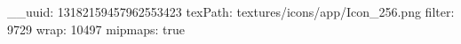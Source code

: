 __uuid: 13182159457962553423
texPath: textures/icons/app/Icon_256.png
filter: 9729
wrap: 10497
mipmaps: true